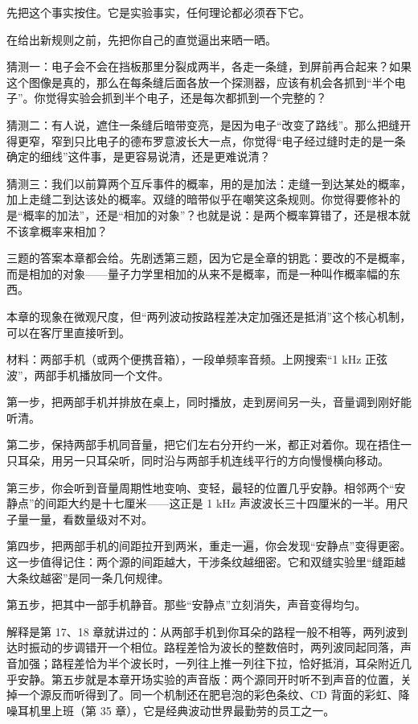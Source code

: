 先把这个事实按住。它是实验事实，任何理论都必须吞下它。


在给出新规则之前，先把你自己的直觉逼出来晒一晒。

猜测一：电子会不会在挡板那里分裂成两半，各走一条缝，到屏前再合起来？如果这个图像是真的，那么在每条缝后面各放一个探测器，应该有机会各抓到“半个电子”。你觉得实验会抓到半个电子，还是每次都抓到一个完整的？

猜测二：有人说，遮住一条缝后暗带变亮，是因为电子“改变了路线”。那么把缝开得更窄，窄到只比电子的德布罗意波长大一点，你觉得“电子经过缝时走的是一条确定的细线”这件事，是更容易说清，还是更难说清？

猜测三：我们以前算两个互斥事件的概率，用的是加法：走缝一到达某处的概率，加上走缝二到达该处的概率。双缝的暗带似乎在嘲笑这条规则。你觉得要修补的是“概率的加法”，还是“相加的对象”？也就是说：是两个概率算错了，还是根本就不该拿概率来相加？

三题的答案本章都会给。先剧透第三题，因为它是全章的钥匙：要改的不是概率，而是相加的对象——量子力学里相加的从来不是概率，而是一种叫作概率幅的东西。


本章的现象在微观尺度，但“两列波动按路程差决定加强还是抵消”这个核心机制，可以在客厅里直接听到。

\begin{experiment}
材料：两部手机（或两个便携音箱），一段单频率音频。上网搜索“1 kHz 正弦波”，两部手机播放同一个文件。

第一步，把两部手机并排放在桌上，同时播放，走到房间另一头，音量调到刚好能听清。

第二步，保持两部手机同音量，把它们左右分开约一米，都正对着你。现在捂住一只耳朵，用另一只耳朵听，同时沿与两部手机连线平行的方向慢慢横向移动。

第三步，你会听到音量周期性地变响、变轻，最轻的位置几乎安静。相邻两个“安静点”的间距大约是十七厘米——这正是 1 kHz 声波波长三十四厘米的一半。用尺子量一量，看数量级对不对。

第四步，把两部手机的间距拉开到两米，重走一遍，你会发现“安静点”变得更密。这一步值得记住：两个源的间距越大，干涉条纹越细密。它和双缝实验里“缝距越大条纹越密”是同一条几何规律。

第五步，把其中一部手机静音。那些“安静点”立刻消失，声音变得均匀。
\end{experiment}

解释是第 17、18 章就讲过的：从两部手机到你耳朵的路程一般不相等，两列波到达时振动的步调错开一个相位。路程差恰为波长的整数倍时，两列波同起同落，声音加强；路程差恰为半个波长时，一列往上推一列往下拉，恰好抵消，耳朵附近几乎安静。第五步就是本章开场实验的声音版：两个源同开时听不到声音的位置，关掉一个源反而听得到了。同一个机制还在肥皂泡的彩色条纹、CD 背面的彩虹、降噪耳机里上班（第 35 章），它是经典波动世界最勤劳的员工之一。

